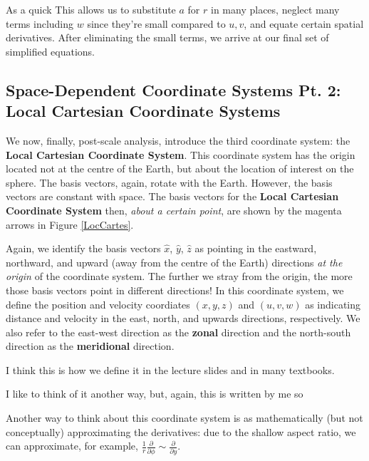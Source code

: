 As a quick 
This allows us to substitute \(a\) for \(r\) in many places, neglect many terms including \(w\) since they're small compared to \(u,v\), and equate certain spatial derivatives. After eliminating the small terms, we arrive at our final set of simplified equations.

\subsection{Space-Dependent Coordinate Systems Pt. 2: Local Cartesian Coordinate Systems}\label{s Local Cartesian Coordinates}

We now, finally, post-scale analysis, introduce the third coordinate system: the \textbf{Local Cartesian Coordinate System}. This coordinate system has the origin located not at the centre of the Earth, but about the location of interest on the sphere. The basis vectors, again, rotate with the Earth. However, the basis vectors are constant with space. The basis vectors for the \textbf{Local Cartesian Coordinate System} then, \textit{about a certain point}, are shown by the magenta arrows in Figure \ref{LocCartes}.

Again, we identify the basis vectors \(\hat{x}\), \(\hat{y}\), \(\hat{z}\) as pointing in the eastward, northward, and upward (away from the centre of the Earth) directions \textit{at the origin} of the coordinate system. The further we stray from the origin, the more those basis vectors point in different directions! In this coordinate system, we define the position and velocity coordiates \((x,y,z)\) and \((u,v,w)\) as indicating distance and velocity in the east, north, and upwards directions, respectively. We also refer to the east-west direction as the \textbf{zonal} direction and the north-south direction as the \textbf{meridional} direction.

I think this is how we define it in the lecture slides and in many textbooks. 

I like to think of it another way, but, again, this is written by me so 

Another way to think about this coordinate system is as mathematically (but not conceptually) approximating the derivatives: due to the shallow aspect ratio, we can approximate, for example, \(\frac{1}{r}\frac{\partial}{\partial\phi}\sim\frac{\partial}{\partial y}\).

